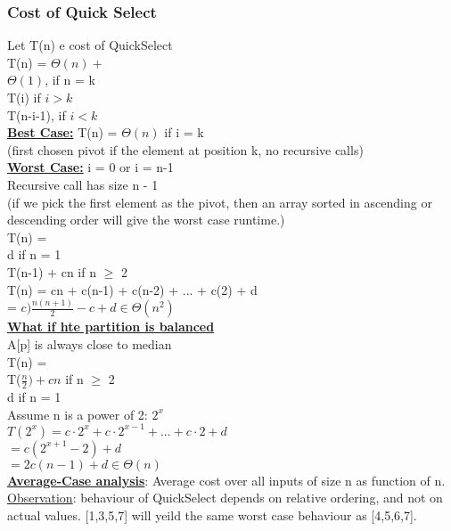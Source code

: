 \documentclass[12pt]{article}
\newcommand{\myt}[1]{\textbf{\underline{#1}}}
\begin{document}
	\subsubsection{Cost of Quick Select}
	Let T(n) e cost of QuickSelect\\
	T(n) = $\Theta(n) + $\\
	$\Theta(1)$, if n = k\\
	T(i) if $i > k$\\
	T(n-i-1), if $i < k$\\
	
	\myt{Best Case:} T(n) = $\Theta(n)$ if i = k\\
	(first chosen pivot if the element at position k, no recursive calls)\\
	
	\myt{Worst Case:} i = 0 or i = n-1\\
	Recursive call has size n - 1\\
	(if we pick the first element as the pivot, then an array sorted in ascending or descending order will give the worst case runtime.)\\
	
	T(n) = \\
	d if n = 1\\
	T(n-1) + cn if n $\geq$ 2\\
	T(n) = cn + c(n-1) + c(n-2) + ... + c(2) + d\\
	= $c)\frac{n(n+1)}{2} - c + d \in \Theta(n^2)$\\
	
	\myt{What if hte partition is balanced}\\
	A[p] is always close to median\\
	T(n) = \\
	T($\frac{n}{2}) + cn$ if n $\geq$ 2\\
	d if n = 1\\
	
	Assume n is a power of 2: $2^x$\\
	$T(2^x) = c \cdot 2^x + c \cdot 2^{x-1} + ... + c \cdot 2 + d$\\
	$ = c(2^{x+1} - 2) + d$\\
	$ = 2c(n-1) + d \in \Theta(n)$\\
	
	\myt{Average-Case analysis}: Average cost over all inputs of size n as function of n.\\
	\underline{Observation}: behaviour of QuickSelect depends on relative ordering, and not on actual values. [1,3,5,7] will yeild the same worst case behaviour as [4,5,6,7].\\
	
\end{document}
